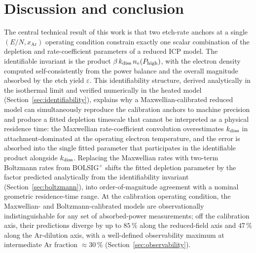 \section{Discussion and conclusion}
\label{sec:discussion}

The central technical result of this work is that two etch-rate
anchors at a single $(E/N, x_{\mathrm{Ar}})$ operating condition
constrain exactly one scalar combination of the depletion and
rate-coefficient parameters of a reduced \sfsix{} ICP model. The
identifiable invariant is the product
$\beta\,k_{\mathrm{diss}}\,n_e(P_{\mathrm{high}})$, with the electron density
computed self-consistently from the power balance and the overall
magnitude absorbed by the etch yield $\varepsilon$. This
identifiability structure, derived analytically in the isothermal
limit and verified numerically in the heated model
(Section~\ref{sec:identifiability}), explains why a
Maxwellian-calibrated reduced model can simultaneously reproduce
the calibration anchors to machine precision and produce a fitted
depletion timescale that cannot be interpreted as a physical
residence time: the Maxwellian rate-coefficient convolution
overestimates $k_{\mathrm{diss}}$ in attachment-dominated \sfsix{} at the
operating electron temperature, and the error is absorbed into
the single fitted parameter that participates in the identifiable
product alongside $k_{\mathrm{diss}}$. Replacing the Maxwellian rates with
two-term Boltzmann rates from BOLSIG$^+$ shifts the fitted
depletion parameter by the factor predicted analytically from the
identifiability invariant (Section~\ref{sec:boltzmann}), into
order-of-magnitude agreement with a nominal geometric
residence-time range. At the calibration operating condition, the
Maxwellian- and Boltzmann-calibrated models are observationally
indistinguishable for any set of absorbed-power measurements; off
the calibration axis, their predictions diverge by up to $85\,\%$
along the reduced-field axis and $47\,\%$ along the Ar-dilution
axis, with a well-defined observability maximum at intermediate Ar
fraction $\approx\!30\,\%$ (Section~\ref{sec:observability}).

